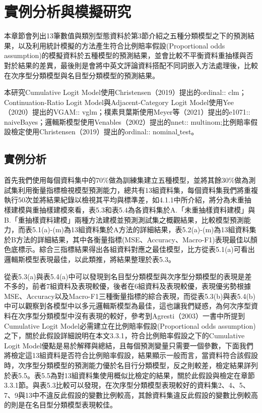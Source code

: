 %
%
\fontsize{12}{22pt}\selectfont
\cleardoublepage
\thispagestyle{empty}
\setlength{\parindent}{2em}
\chapter{實例分析與模擬研究}
	本章節會列出13筆數值與類別型態資料於第3節介紹之五種分類模型之下的預測結果，以及利用統計模擬的方法產生符合比例賠率假設(Proportional odds assumption)的模擬資料於五種模型的預測結果，並會比較不平衡資料重抽樣與否對於結果的差異，最後則是會將中英文評論資料搭配不同詞嵌入方法處理後，比較在次序型分類模型與名目型分類模型的預測結果。
	
	本研究Cumulative Logit Model使用Christensen（2019）提出的ordinal:: clm；Continuation-Ratio Logit Model與Adjacent-Category Logit Model使用Yee（2020）提出的VGAM:: vglm；樸素貝葉斯使用Meyer等（2021）提出的e1071:: naiveBayes；邏輯斯模型使用Venables（2002）提出的nnet:: multinom;比例賠率假設檢定使用Christensen（2019）提出的ordinal:: nominal\underline{ }test。

\section{實例分析}
	首先我們使用每個資料集中的70\%做為訓練集建立五種模型，並將其餘30\%做為測試集利用衡量指標檢視模型預測能力，總共有13組資料集，每個資料集我們將重複執行50次並將結果紀錄以檢視其平均與標準差，如4.1.1中所介紹，將分為未重抽樣建模與重抽樣建模來看，表5.3和表5.4為各資料集於A.「未重抽樣資料建模」與B.「重抽樣資料建模」兩種方法建模並預測測試集之概觀結果，比較模型預測能力，而表5.1(a)-(m)為13組資料集於A方法的詳細結果，表5.2(a)-(m)為13組資料集於B方法的詳細結果，其中各衡量指標(MSE、Accuracy、Macro-F1)表現最佳以顏色底標示。綜合三指標結果得出各組資料對應之最佳模型，比方從表5.1(a)可看出邏輯斯模型表現最佳，以此類推，將結果整理於表5.3。
	
	從表5.3(a)與表5.4(a)中可以發現到名目型分類模型與次序型分類模型的表現是差不多的，前者7組資料及表現較優，後者在6組資料及表現較優，表現優劣勢根據MSE、Accuracy以及Macro-F1三種衡量指標的綜合表現，而從表5.3(b)與表5.4(b)中可以觀察到各模型中以多元邏輯斯模型為最佳，這也讓我們疑惑，為何次序型資料在次序型分類模型中沒有表現的較好，參考到Agresti（2003）一書中所提到Cumulative Logit Model必需建立在比例賠率假設(Proportional odds assumption)之下，關於此假設詳細說明在本文3.3.1，符合比例賠率假設之下的Cumulative Logit Model優點是易於解釋與總結，且每個預測變量只需要一個參數，下面我們將檢定這13組資料是否符合比例賠率假設，結果顯示一般而言，當資料符合該假設時，次序型分類模型的預測能力優於名目行分類模型，反之則較差，檢定結果詳列於表5.5。表5.5為對13組資料集使用概似比檢定的結果，關於此假設與檢定在章節3.3.1節。與表5.3比較可以發現，在次序型分類模型表現較好的資料集2、4、5、7、9與13中不違反此假設的變數比例較高，其餘資料集違反此假設的變數比例較高的則是在名目型分類模型表現較佳。
	

